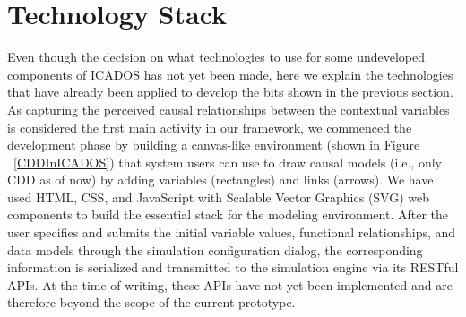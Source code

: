 \documentclass{sfuthesis}
\begin{document}
\section{Technology Stack}
Even though the decision on what technologies to use for some undeveloped components of ICADOS has not yet been made, here we explain the technologies that have already been applied to develop the bits shown in the previous section. As capturing the perceived causal relationships between the contextual variables is considered the first main activity in our framework, we commenced the development phase by building a canvas-like environment (shown in Figure ~\ref{CDDInICADOS}) that system users can use to draw causal models (i.e., only CDD as of now) by adding variables (rectangles) and links (arrows). We have used HTML, CSS, and JavaScript with Scalable Vector Graphics (SVG) web components to build the essential stack for the modeling environment. After the user specifies and submits the initial variable values, functional relationships, and data models through the simulation configuration dialog, the corresponding information is serialized and transmitted to the simulation engine via its RESTful APIs. At the time of writing, these APIs have not yet been implemented and are therefore beyond the scope of the current prototype.
\end{document}
